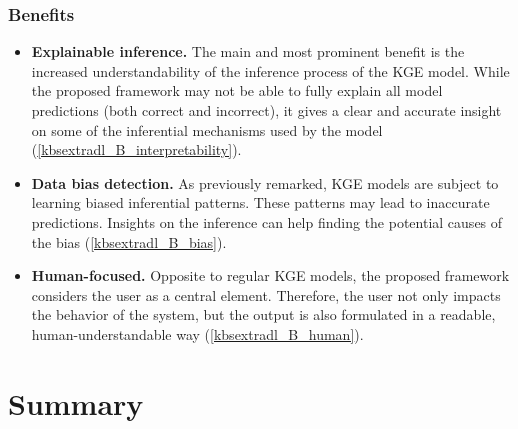 \subsubsection*{Benefits}
\begin{itemize}
    \item \textbf{Explainable inference.} The main and most prominent benefit is the increased understandability of the inference process of the KGE model. While the proposed framework may not be able to fully explain all model predictions (both correct and incorrect), it gives a clear and accurate insight on some of the inferential mechanisms used by the model (\ref{kbsextradl_B_interpretability}).
    
    \item \textbf{Data bias detection.} As previously remarked, KGE models are subject to learning biased inferential patterns. These patterns may lead to inaccurate predictions. Insights on the inference can help finding the potential causes of the bias (\ref{kbsextradl_B_bias}).   
    
    \item \textbf{Human-focused.} Opposite to regular KGE models, the proposed framework considers the user as a central element. Therefore, the user not only impacts the behavior of the system, but the output is also formulated in a readable, human-understandable way (\ref{kbsextradl_B_human}). 
\end{itemize}


\section{Summary}\label{6_sec:summary}